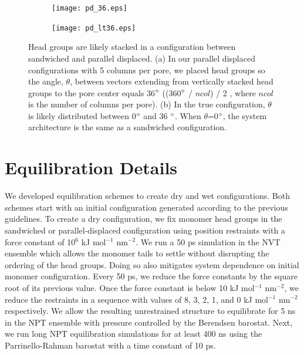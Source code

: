 \documentclass{article}
\begin{document}
  \begin{figure}[!htb]
  \centering
  \begin{subfigure}{0.45\textwidth}
  \centering
  \texttt{[image: pd\_36.eps]}
  \caption{}\label{fig:pd_36}
  \end{subfigure}
  \begin{subfigure}{0.45\textwidth}
  \centering
  \texttt{[image: pd\_lt36.eps]}
  \caption{}\label{fig:pd_lt36}
  \end{subfigure}
  \caption{Head groups are likely stacked in a configuration between sandwiched and
  parallel displaced. (a) In our parallel displaced configurations with 5 columns 
  per pore, we placed head groups so the angle, $\theta$, between vectors extending
  from vertically stacked head groups to the pore center equals 36$\degree$ 
  ((360$\degree$ / $ncol$) / 2 , where $ncol$ is the number of columns per pore). 
  (b) In the true configuration, $\theta$ is likely distributed between 0$\degree$
  and 36 $\degree$. When $\theta$=0$\degree$, the system architecture is the same
  as a sandwiched configuration.}\label{fig:between_pd}
  \end{figure}

  \section{Equilibration Details}\label{section:equilibration}
  
  We developed equilibration schemes to create dry and wet configurations. Both
  schemes start with an initial configuration generated according to the previous
  guidelines. To create a dry configuration, we fix monomer head groups in the
  sandwiched or parallel-displaced configuration using position restraints with a
  force constant of 10$^6$ kJ mol$^{-1}$ nm$^{-2}$. We run a 50 ps simulation in
  the NVT ensemble which allows the monomer tails to settle without disrupting
  the ordering of the head groups. Doing so also mitigates system dependence on
  initial monomer configuration. Every 50 ps, we reduce the force constants by
  the square root of its previous value. Once the force constant is below 10 kJ
  mol$^{-1}$ nm$^{-2}$, we reduce the restraints in a sequence with values of
  8, 3, 2, 1, and 0 kJ mol$^{-1}$ nm$^{-2}$ respectively. We allow the resulting
  unrestrained structure to equilibrate for 5 ns in the NPT ensemble
  with pressure controlled by the Berendsen barostat. Next, we run long NPT
  equilibration simulations for at least 400 ns using the Parrinello-Rahman
  barostat with a time constant of 10 ps.
\end{document}
